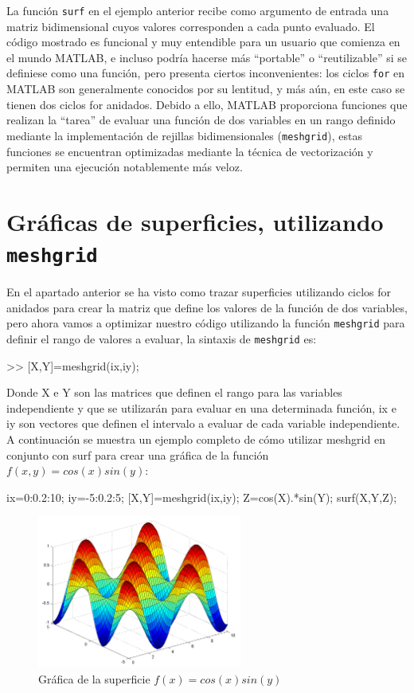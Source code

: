 La función \texttt{surf} en el ejemplo anterior recibe como argumento de
entrada una matriz bidimensional cuyos valores corresponden a cada punto
evaluado. El código mostrado es funcional y muy entendible para un
usuario que comienza en el mundo MATLAB, e incluso podría hacerse más
``portable'' o ``reutilizable'' si se definiese como una función, pero
presenta ciertos inconvenientes: los ciclos \texttt{for} en MATLAB son
generalmente conocidos por su lentitud, y más aún, en este caso se
tienen dos ciclos for anidados. Debido a ello, MATLAB proporciona
funciones que realizan la ``tarea'' de evaluar una función de dos
variables en un rango definido mediante la implementación de rejillas
bidimensionales (\texttt{meshgrid}), estas funciones se encuentran
optimizadas mediante la técnica de vectorización y permiten una
ejecución notablemente más veloz.

\section{Gráficas de superficies, utilizando \texttt{meshgrid}}

En el apartado anterior se ha visto como trazar superficies utilizando
ciclos for anidados para crear la matriz que define los valores de la
función de dos variables, pero ahora vamos a optimizar nuestro código
utilizando la función \texttt{meshgrid} para definir el rango de valores
a evaluar, la sintaxis de \texttt{meshgrid} es:

\begin{matlab}
>> [X,Y]=meshgrid(ix,iy);
\end{matlab}

Donde X e Y son las matrices que definen el rango para las variables
independiente y que se utilizarán para evaluar en una determinada
función, ix e iy son vectores que definen el intervalo a evaluar de cada
variable independiente. A continuación se muestra un ejemplo completo de
cómo utilizar meshgrid en conjunto con surf para crear una gráfica de la
función  $f(x,y)=cos(x) sin(y)$:

\begin{matlab}
ix=0:0.2:10;
iy=-5:0.2:5;
[X,Y]=meshgrid(ix,iy);
Z=cos(X).*sin(Y);
surf(X,Y,Z);
\end{matlab}

\begin{figure}[htbp]
    \centering
    \includegraphics[width=0.6\textwidth]{images/ch4/img_4_8.png}
    \caption{Gráfica de la superficie $f(x)=cos(x) sin(y)$}
    \label{fig:img_4_8}
\end{figure}

